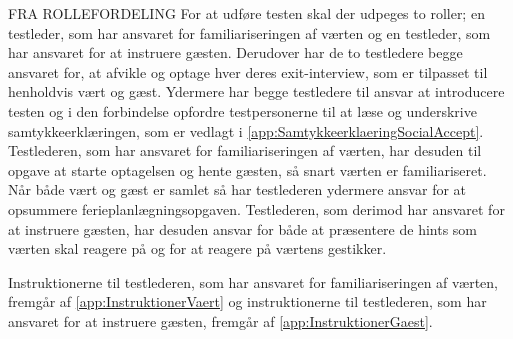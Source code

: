 FRA ROLLEFORDELING 
% 
For at udføre testen skal der udpeges to roller; en testleder, som har ansvaret for familiariseringen af værten og en testleder, som har ansvaret for at instruere gæsten. Derudover har de to testledere begge ansvaret for, at afvikle og optage hver deres exit-interview, som er tilpasset til henholdvis vært og gæst. Ydermere har begge testledere til ansvar at introducere testen og i den forbindelse opfordre testpersonerne til at læse og underskrive samtykkeerklæringen, som er vedlagt i \autoref{app:SamtykkeerklaeringSocialAccept}. Testlederen, som har ansvaret for familiariseringen af værten, har desuden til opgave at starte optagelsen og hente gæsten, så snart værten er familiariseret. Når både vært og gæst er samlet så har testlederen ydermere ansvar for at opsummere ferieplanlægningsopgaven. Testlederen, som derimod har ansvaret for at instruere gæsten, har desuden ansvar for både at præsentere de hints som værten skal reagere på og for at reagere på værtens gestikker.

Instruktionerne til testlederen, som har ansvaret for familiariseringen af værten, fremgår af \autoref{app:InstruktionerVaert} og instruktionerne til testlederen, som har ansvaret for at instruere gæsten, fremgår af \autoref{app:InstruktionerGaest}.    
